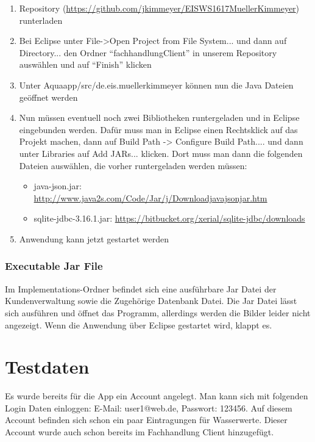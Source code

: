 \begin{enumerate}
\item Repository (\url{https://github.com/jkimmeyer/EISWS1617MuellerKimmeyer}) runterladen
\item Bei Eclipse unter File->Open Project from File System... und dann auf Directory... den Ordner ``fachhandlungClient'' in unserem Repository auswählen und auf ``Finish'' klicken
\item Unter Aquaapp/src/de.eis.muellerkimmeyer können nun die Java Dateien geöffnet werden
\item Nun müssen eventuell noch zwei Bibliotheken runtergeladen und in Eclipse eingebunden werden. Dafür muss man in Eclipse einen Rechtsklick auf das Projekt machen, dann auf Build Path -> Configure Build Path.... und dann unter Libraries auf Add JARs... klicken. Dort muss man dann die folgenden Dateien auswählen, die vorher runtergeladen werden müssen:
\begin{itemize}
\item java-json.jar: \url{http://www.java2s.com/Code/Jar/j/Downloadjavajsonjar.htm}
\item sqlite-jdbc-3.16.1.jar: \url{https://bitbucket.org/xerial/sqlite-jdbc/downloads}
\end{itemize}
\item Anwendung kann jetzt gestartet werden
\end{enumerate}

\subsubsection{Executable Jar File}

Im Implementations-Ordner befindet sich eine ausführbare Jar Datei der Kundenverwaltung sowie die Zugehörige Datenbank Datei. Die Jar Datei lässt sich ausführen und öffnet das Programm, allerdings werden die Bilder leider nicht angezeigt. Wenn die Anwendung über Eclipse gestartet wird, klappt es.

\section{Testdaten}

Es wurde bereits für die App ein Account angelegt. Man kann sich mit folgenden Login Daten einloggen: E-Mail: user1@web.de, Passwort: 123456. Auf diesem Account befinden sich schon ein paar Eintragungen für Wasserwerte. Dieser Account wurde auch schon bereits im Fachhandlung Client hinzugefügt.